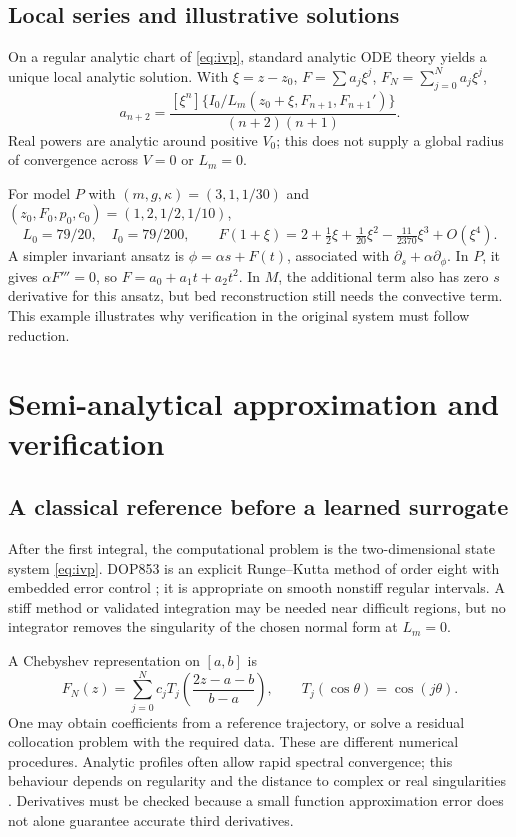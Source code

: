 \documentclass[11pt,a4paper,oneside]{report}
\numberwithin{equation}{chapter}
\begin{document}
\section{Local series and illustrative solutions}
On a regular analytic chart of \eqref{eq:ivp}, standard analytic ODE theory \cite{teschl2012} yields a unique local analytic solution. With $\xi=z-z_0$, $F=\sum a_j\xi^j$, $F_N=\sum_{j=0}^Na_j\xi^j$,
\begin{equation}\label{eq:recurrence}
a_{n+2}=\frac{[\xi^n]\{I_0/L_m(z_0+\xi,F_{n+1},F_{n+1}')\}}{(n+2)(n+1)}.
\end{equation}
Real powers are analytic around positive $V_0$; this does not supply a global radius of convergence across $V=0$ or $L_m=0$.

For model $P$ with $(m,g,\kappa)=(3,1,1/30)$ and $(z_0,F_0,p_0,c_0)=(1,2,1/2,1/10)$,
\begin{equation}\label{eq:taylor-example}
L_0=79/20,\quad I_0=79/200,\qquad
F(1+\xi)=2+\tfrac12\xi+\tfrac1{20}\xi^2-\tfrac{11}{2370}\xi^3+O(\xi^4).
\end{equation}
A simpler invariant ansatz is $\phi=\alpha s+F(t)$, associated with $\partial_s+\alpha\partial_\phi$. In $P$, it gives $\alpha F'''=0$, so $F=a_0+a_1t+a_2t^2$. In $M$, the additional term also has zero $s$ derivative for this ansatz, but bed reconstruction still needs the convective term. This example illustrates why verification in the original system must follow reduction.

\chapter{Semi-analytical approximation and verification}\label{ch:methods}
\section{A classical reference before a learned surrogate}
After the first integral, the computational problem is the two-dimensional state system \eqref{eq:ivp}. DOP853 is an explicit Runge--Kutta method of order eight with embedded error control \cite{hairer}; it is appropriate on smooth nonstiff regular intervals. A stiff method or validated integration may be needed near difficult regions, but no integrator removes the singularity of the chosen normal form at $L_m=0$.

A Chebyshev representation on $[a,b]$ is
\begin{equation}
F_N(z)=\sum_{j=0}^N c_jT_j\!\left(\frac{2z-a-b}{b-a}\right),\qquad
T_j(\cos\theta)=\cos(j\theta).
\end{equation}
One may obtain coefficients from a reference trajectory, or solve a residual collocation problem with the required data. These are different numerical procedures. Analytic profiles often allow rapid spectral convergence; this behaviour depends on regularity and the distance to complex or real singularities \cite{trefethen}. Derivatives must be checked because a small function approximation error does not alone guarantee accurate third derivatives.
\end{document}
